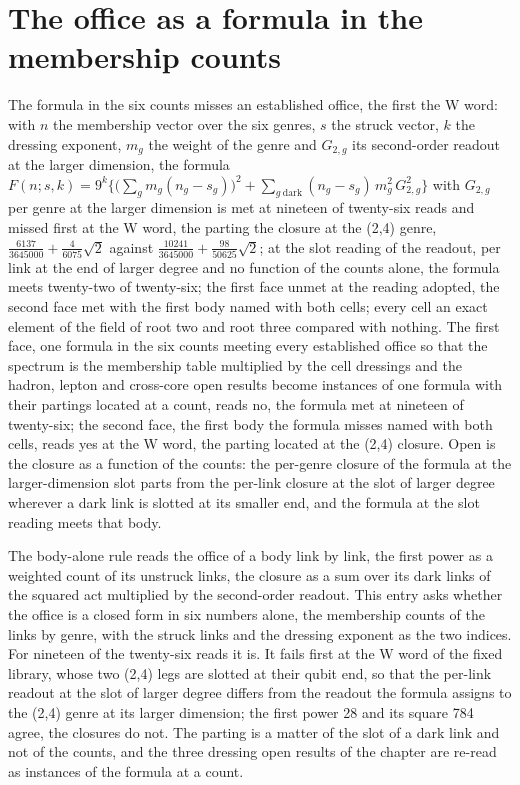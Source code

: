 \section{The office as a formula in the membership counts}\label{mod:VIII-1-D543206-w-ofmc}
\begin{chwall}\label{box:VIII-1-D543206-w-ofmc:1}
The formula in the six counts misses an established office, the first the W word: with $n$ the membership vector over the six genres, $s$ the struck vector, $k$ the dressing exponent, $m_{g}$ the weight of the genre and $G_{2,g}$ its second-order readout at the larger dimension, the formula $F(n; s, k) = 9^{k}\big\{\big(\sum_{g} m_{g}(n_{g} - s_{g})\big)^{2} + \sum_{g\ \mathrm{dark}} (n_{g} - s_{g})\, m_{g}^{2}\, G_{2,g}^{2}\big\}$ with $G_{2,g}$ per genre at the larger dimension is met at nineteen of twenty-six reads and missed first at the W word, the parting the closure at the (2,4) genre, $\tfrac{6137}{3645000} + \tfrac{4}{6075}\sqrt{2}$ against $\tfrac{10241}{3645000} + \tfrac{98}{50625}\sqrt{2}$; at the slot reading of the readout, per link at the end of larger degree and no function of the counts alone, the formula meets twenty-two of twenty-six; the first face unmet at the reading adopted, the second face met with the first body named with both cells; every cell an exact element of the field of root two and root three compared with nothing.
The first face, one formula in the six counts meeting every established office so that the spectrum is the membership table multiplied by the cell dressings and the hadron, lepton and cross-core open results become instances of one formula with their partings located at a count, reads no, the formula met at nineteen of twenty-six; the second face, the first body the formula misses named with both cells, reads yes at the W word, the parting located at the (2,4) closure. Open is the closure as a function of the counts: the per-genre closure of the formula at the larger-dimension slot parts from the per-link closure at the slot of larger degree wherever a dark link is slotted at its smaller end, and the formula at the slot reading meets that body.
\end{chwall}
The body-alone rule reads the office of a body link by link, the first power as a weighted count of its unstruck links, the closure as a sum over its dark links of the squared act multiplied by the second-order readout. This entry asks whether the office is a closed form in six numbers alone, the membership counts of the links by genre, with the struck links and the dressing exponent as the two indices. For nineteen of the twenty-six reads it is. It fails first at the W word of the fixed library, whose two (2,4) legs are slotted at their qubit end, so that the per-link readout at the slot of larger degree differs from the readout the formula assigns to the (2,4) genre at its larger dimension; the first power 28 and its square 784 agree, the closures do not. The parting is a matter of the slot of a dark link and not of the counts, and the three dressing open results of the chapter are re-read as instances of the formula at a count.
